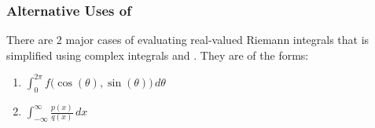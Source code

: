 \subsubsection{Alternative Uses of }\label{subsubsec:Alternative_Uses_Cauchys_Residue_Theorem}
There are 2 major cases of evaluating real-valued Riemann integrals that is simplified using complex integrals and .
They are of the forms:
\begin{enumerate}[noitemsep]
\item $\int_{0}^{2\pi} f \bigl( \cos(\theta), \sin(\theta) \bigr) \, d\theta$
\item $\int_{-\infty}^{\infty} \frac{p(x)}{q(x)} \, dx$
\end{enumerate}

